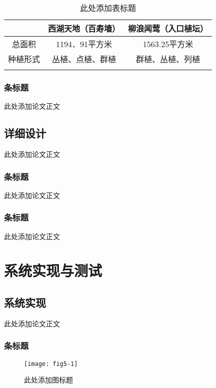 \documentclass{article}
\begin{document}
\begin{table}[H]
\centering
\caption{此处添加表标题}\label{tab1-1}
\begin{tabular}{!{\vrule width1.2pt}c|c|c!{\vrule width1.2pt}}
\Xhline{1.2pt}
 & 西湖天地（百寿墙） & 柳浪闻莺（入口植坛）\\ \hline
总面积 & 1194．91平方米 & 1563.25平方米\\ \hline
种植形式 & 丛植、点植、群植  & 群植、丛植、列植\\ \Xhline{1.2pt}
\end{tabular}
\end{table}


\subsubsection{条标题}
此处添加论文正文

\subsection{详细设计}
此处添加论文正文

\subsubsection{条标题}
此处添加论文正文

\subsubsection{条标题}
此处添加论文正文


\section{系统实现与测试  }

\subsection{系统实现}
此处添加论文正文

\subsubsection{条标题}

\begin{figure}[H]
\centering
\texttt{[image: fig5-1]}
\caption{此处添加图标题}\label{fig5-1}
\end{figure}
\end{document}
